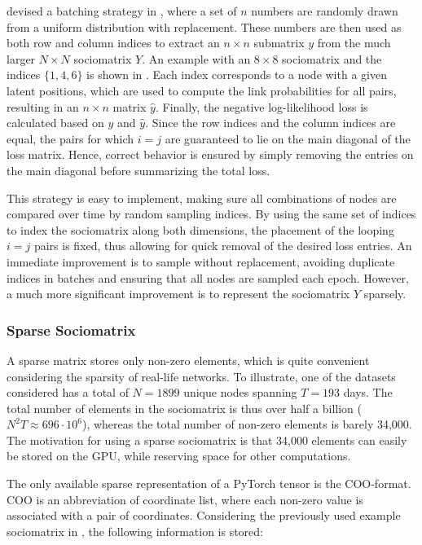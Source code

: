         \citeauthor{jacobsen2018a} devised a batching strategy in \cite{jacobsen2018a}, where a set of $n$ numbers are randomly drawn from a uniform distribution with replacement. These numbers are then used as both row and column indices to extract an $n\times n$ submatrix $y$ from the much larger $N\times N$ sociomatrix $Y$. An example with an $8\times 8$ sociomatrix and the indices $\{1,4,6\}$ is shown in . Each index corresponds to a node with a given latent positions, which are used to compute the link probabilities for all pairs, resulting in an $n\times n$ matrix $\hat{y}$. Finally, the negative log-likelihood loss is calculated based on $y$ and $\hat{y}$. Since the row indices and the column indices are equal, the pairs for which $i=j$ are guaranteed to lie on the main diagonal of the loss matrix. Hence, correct behavior is ensured by simply removing the entries on the main diagonal before summarizing the total loss. 
        
        This strategy is easy to implement, making sure all combinations of nodes are compared over time by random sampling indices. By using the same set of indices to index the sociomatrix along both dimensions, the placement of the looping $i=j$ pairs is fixed, thus allowing for quick removal of the desired loss entries.
        An immediate improvement is to sample without replacement, avoiding duplicate indices in batches and ensuring that all nodes are sampled each epoch. However, a much more significant improvement is to represent the sociomatrix $Y$ sparsely.
        
    \subsubsection{Sparse Sociomatrix}
    
        A sparse matrix stores only non-zero elements, which is quite convenient considering the sparsity of real-life networks. To illustrate, one of the datasets considered has a total of $N=1899$ unique nodes spanning $T=193$ days. The total number of elements in the sociomatrix is thus over half a billion ($N^2T \approx 696\cdot 10^6$), whereas the total number of non-zero elements is barely 34,000. The motivation for using a sparse sociomatrix is that 34,000 elements can easily be stored on the GPU, while reserving space for other computations.
        
        The only available sparse representation of a PyTorch tensor is the COO-format. COO is an abbreviation of coordinate list, where each non-zero value is associated with a pair of coordinates. Considering the previously used example sociomatrix in , the following information is stored:
        
